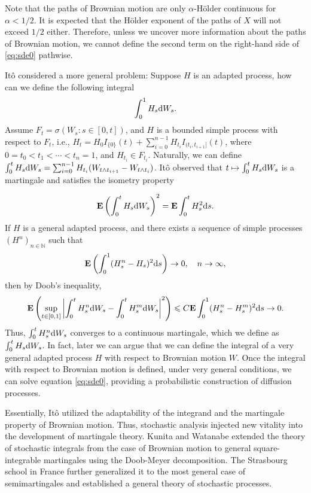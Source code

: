 Note that the paths of Brownian motion are only \(\alpha\)-Hölder continuous for \(\alpha < 1/2\). It is expected that the Hölder exponent of the paths of \(X\) will not exceed \(1/2\) either. Therefore, unless we uncover more information about the paths of Brownian motion, we cannot define the second term on the right-hand side of \eqref{eq:sde0} pathwise. 

Itô considered a more general problem: Suppose \(H\) is an adapted process, how can we define the following integral
\[
    \int_0^1 H_s \text{\rm{d}} W_s.
\]
Assume \(F_t = \sigma(W_s : s \in [0,t])\), and \(H\) is a bounded simple process with respect to \(F_t\), i.e., \(H_t = H_0 I_{\{0\}}(t) + \sum_{i=0}^{n-1} H_{t_i}I_{(t_i,t_{i+1}]}(t)\), where \(0 = t_0 < t_1 < \cdots < t_n = 1\), and \(H_{t_i} \in F_{t_i}\). Naturally, we can define \(\int_0^t H_s \text{\rm{d}} W_s = \sum_{i=0}^{n-1} H_{t_i}(W_{t\wedge t_{i+1}} - W_{t\wedge t_i})\). Itô observed that \(t \mapsto \int_0^t H_s \text{\rm{d}} W_s\) is a martingale and satisfies the isometry property

\[\mathbf{E}\left(\int_0^t H_s \text{\rm{d}} W_s\right)^2 = \mathbf{E}\int_0^t H_s^2 \text{\rm{d}} s.\]
If \(H\) is a general adapted process, and there exists a sequence of simple processes \((H^n)_{n \in \mathbb{N}}\) such that
\[\mathbf{E}\left(\int_0^1 (H_s^n - H_s)^2 \text{\rm{d}} s\right) \to 0, \quad n \to \infty,\]
then by Doob's inequality,
\[\mathbf{E}\left(\sup_{t \in [0,1]} \left| \int_0^t H_s^n \text{\rm{d}} W_s - \int_0^t H_s^{m} \text{\rm{d}} W_s \right|^2 \right) \leqslant C \mathbf{E}\int_0^1 (H_s^n - H_s^{m})^2 \text{\rm{d}} s \to 0.\]
Thus, \(\int_0^t H_s^n \text{\rm{d}} W_s\) converges to a continuous martingale, which we define as \(\int_0^t H_s \text{\rm{d}} W_s\). In fact, later we can argue that we can define the integral of a very general adapted process \(H\) with respect to Brownian motion \(W\). Once the integral with respect to Brownian motion is defined, under very general conditions, we can solve equation \eqref{eq:sde0}, providing a probabilistic construction of diffusion processes.

Essentially, Itô utilized the adaptability of the integrand and the martingale property of Brownian motion. Thus, stochastic analysis injected new vitality into the development of martingale theory. Kunita and Watanabe extended the theory of stochastic integrals from the case of Brownian motion to general square-integrable martingales using the Doob-Meyer decomposition. The Strasbourg school in France further generalized it to the most general case of semimartingales and established a general theory of stochastic processes. 

